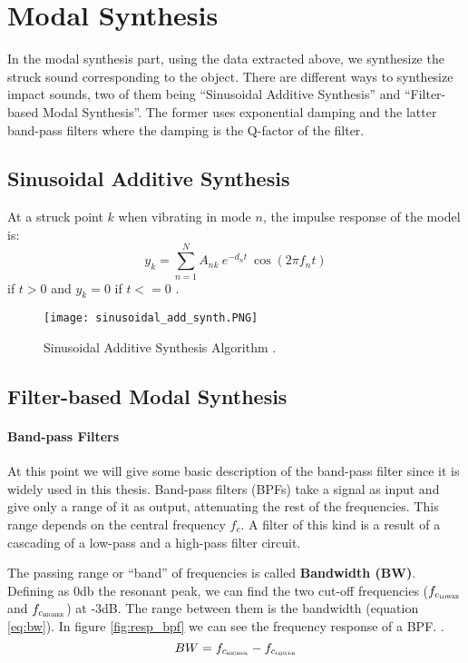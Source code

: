 \section{Modal Synthesis}\label{sec:modal_synth}
In the modal synthesis part, using the data extracted above, we synthesize the struck sound corresponding to the object. There are different ways to synthesize impact sounds, two of them being ``Sinusoidal Additive Synthesis'' and ``Filter-based Modal Synthesis''. The former uses exponential damping and the latter band-pass filters where the damping is the Q-factor of the filter. 

\subsection{Sinusoidal Additive Synthesis}\label{sec:sin_synth}
At a struck point $k$ when vibrating in mode $n$, the impulse response of the model is:
\begin{equation}\label{eq:modal_response}
y_k = \sum\limits_{n=1}^{N} A_{nk}\ e^{-d_n t}\ \cos(2 \pi f_nt)
\end{equation}
if $t>0$ and $y_k = 0$ if $t<=0$ \cite{van2001foleyautomatic}.

\begin{figure}[H]
  \centering
    \texttt{[image: sinusoidal\_add\_synth.PNG]}
      \caption{Sinusoidal Additive Synthesis Algorithm \cite{Cook:2002:RSS:515316}.}
      \label{fig:sin_add_synth}
\end{figure}

\subsection{Filter-based Modal Synthesis}\label{sec:add_synth}

\paragraph{Band-pass Filters\\}\label{par:bpf}

At this point we will give some basic description of the band-pass filter since it is widely used in this thesis. Band-pass filters (BPFs) take a signal as input and give only a range of it as output, attenuating the rest of the frequencies. This range depends on the central frequency $f_c$. A filter of this kind is a result of a cascading of a low-pass and a high-pass filter circuit.

The passing range or ``band'' of frequencies is called \textbf{Bandwidth (BW)}. Defining as 0db the resonant peak, we can find the two cut-off frequencies ($f_{c{_\textsc{lower}}}$ and $f_{c_{\textsc{higher}}}$) at -3dB. The range between them is the bandwidth (equation \ref{eq:bw}). In figure \ref{fig:resp_bpf} we can see the frequency response of a BPF. \cite{bib:bpf}. 
\begin{equation}\label{eq:bw}
BW = f_{c_{\textsc{higher}}}-f_{c_{\textsc{lower}}}
\end{equation}   

